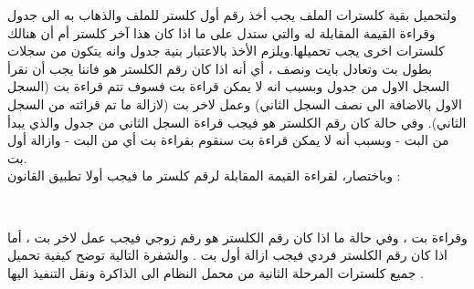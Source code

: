 \documentclass[document.tex]{subfiles}
\begin{document}
ولتحميل بقية كلسترات الملف يجب أخذ رقم أول كلستر للملف والذهاب به الى جدول  وقراءة القيمة المقابلة له والتي ستدل على ما اذا كان هذا آخر كلستر أم أن هنالك كلسترات اخرى يجب تحميلها.ويلزم الأخذ بالاعتبار بنية جدول  وانه يتكون من سجلات بطول  بت وتعادل بايت ونصف ، أي أنه اذا كان رقم الكلستر هو  فاننا يجب أن نقرأ السجل الاول من جدول  وبسبب انه لا يمكن قراءة  بت فسوف تتم قراءة  بت (السجل الاول بالاضافة الى نصف السجل الثاني) وعمل  لاخر  بت (لازالة ما تم قرائته من السجل الثاني). وفي حالة كان رقم الكلستر هو   فيجب قراءة السجل الثاني من جدول  والذي يبدأ من البت - وبسبب أنه لا يمكن قراءة  بت سنقوم بقراءة  بت أي من البت - وازالة أول  بت.\\

وباختصار، لقراءة القيمة المقابلة لرقم كلستر ما فيجب أولا تطبيق القانون :\\
\begin{english}
\\
\end{english}

 وقراءة  بت ، وفي حالة ما اذا كان رقم الكلستر هو رقم زوجي فيجب عمل  لاخر  بت ، أما اذا كان رقم الكلستر فردي فيجب ازالة أول  بت . والشفرة التالية توضح كيفية تحميل جميع كلسترات المرحلة الثانية من محمل النظام الى الذاكرة ونقل التنفيذ اليها .

\begin{english}
\lstset{numberstyle=\tiny,numbers=left,stepnumber=1,numbersep=5pt,tabsize=2,extendedchars=true,breaklines=true,frame=b,showspaces=false, showtabs=false,xleftmargin=10pt,framexleftmargin=10pt,framexrightmargin=5pt,framexbottommargin=4pt,showstringspaces=false,language=[x86masm]Assembler}


\end{english}
\end{document}
